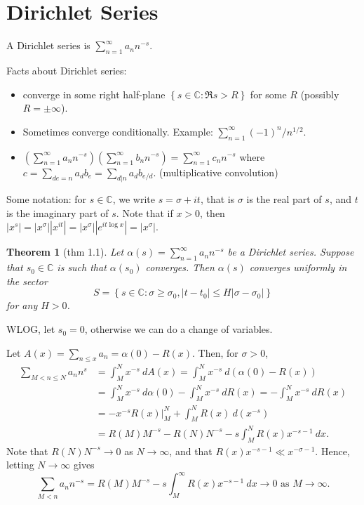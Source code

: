\documentclass[11pt]{article}
\newtheorem{thm}{Theorem}[subsection]
\theoremstyle{definition}
\newcommand{\set}[1]{\left\{ #1 \right\}}
\newcommand{\abs}[1]{\left\lvert#1\right\rvert} %
\newcommand{\CC}{\mathbb{C}}
\begin{document}

\section{Dirichlet Series}

A Dirichlet series is $\sum_{n=1}^\infty a_nn^{-s}$.

Facts about Dirichlet series:
\begin{itemize}
\item converge in some right half-plane $\set{s\in\CC:\Re s>R}$ for some $R$ (possibly
$R=\pm\infty$).
\item Sometimes converge conditionally. Example: $\sum_{n=1}^\infty(-1)^n/n^{1/2}$.
\item $\left(\sum_{n=1}^\infty a_nn^{-s}\right)\left(\sum_{n=1}^\infty b_nn^{-s}\right)
= \sum_{n=1}^\infty c_nn^{-s}$ where $c=\sum_{de=n}a_db_e=\sum_{d|n}a_db_{e/d}$.
(multiplicative convolution)
\end{itemize}

Some notation: for $s\in\CC$, we write $s=\sigma+it$, that is $\sigma$ is the real part of
$s$, and $t$ is the imaginary part of $s$. Note that if $x>0$, then
$\abs{x^s}=\abs{x^\sigma}\abs{x^{it}}=\abs{x^\sigma}\abs{e^{it\log{x}}}=\abs{x^\sigma}$.

\begin{thm}[thm 1.1]\label{thm:1.1}
Let $\alpha(s)=\sum_{n=1}^\infty a_nn^{-s}$ be a Dirichlet series. Suppose that
$s_0\in\CC$ is such that $\alpha(s_0)$ converges. Then $\alpha(s)$ converges uniformly in
the sector
\[
S=\set{s\in\CC:\sigma\ge\sigma_0,\abs{t-t_0}\le H\abs{\sigma-\sigma_0}}
\]
for any $H>0$.
\end{thm}

\proof
WLOG, let $s_0=0$, otherwise we can do a change of variables.

Let $A(x)=\sum_{n\le x}a_n=\alpha(0)-R(x)$. Then, for $\sigma>0$,
\begin{align*}
\sum_{M<n\le N}a_n n^s &= \int_M^N x^{-s} ~dA(x) = \int_M^N x^{-s} ~d(\alpha(0)-R(x)) \\
&= \int_M^N x^{-s} ~d\alpha(0) - \int_M^N x^{-s} ~dR(x) = -\int_M^N x^{-s} ~dR(x) \\
&= \left.-x^{-s}R(x)\right|_M^N + \int_M^N R(x) ~d(x^{-s}) \\
&= R(M)M^{-s} - R(N)N^{-s} - s\int_M^N R(x)x^{-s-1} ~dx .
\end{align*}
Note that $R(N)N^{-s}\to0$ as $N\to\infty$, and that $R(x)x^{-s-1}\ll x^{-\sigma-1}$.
Hence, letting $N\to\infty$ gives
\[
  \sum_{M<n}a_nn^{-s} = R(M)M^{-s} - s\int_M^\infty R(x)x^{-s-1} ~dx
  \to 0 \text{ as } M \to \infty .
\]
\end{document}
